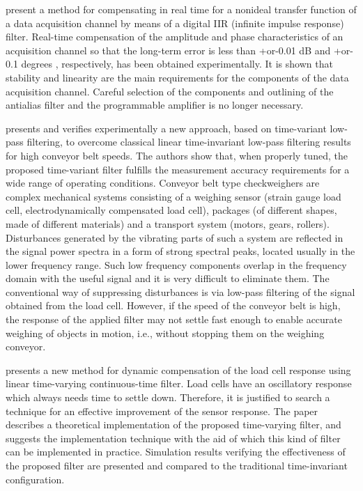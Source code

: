 \documentclass[11pt]{article}
\begin{document}
\citet{Pintelon90} present a method for compensating in real time for a nonideal transfer function of a data acquisition channel by means of a digital IIR (infinite impulse response) filter. Real-time compensation of the amplitude and phase characteristics of an acquisition channel so that the long-term error is less than +or-0.01 dB and +or-0.1 degrees , respectively, has been obtained experimentally. It is shown that stability and linearity are the main requirements for the components of the data acquisition channel. Careful selection of the components and outlining of the antialias filter and the programmable amplifier is no longer necessary.


\citet{Pietrzak14}  presents and verifies experimentally a new approach, based on time-variant low-pass filtering, to overcome classical linear time-invariant low-pass filtering results for high conveyor belt speeds. The authors show that, when properly tuned, the proposed time-variant filter fulfills the measurement accuracy requirements for a wide range of operating conditions.
Conveyor belt type checkweighers are complex mechanical systems consisting of a weighing sensor (strain gauge load cell, electrodynamically compensated load cell), packages (of different shapes, made of different materials) and a transport system (motors, gears, rollers). Disturbances generated by the vibrating parts of such a system are reflected in the signal power spectra in a form of strong spectral peaks, located usually in the lower frequency range. Such low frequency components overlap in the frequency domain with the useful signal and it is very difficult to eliminate them. The conventional way of suppressing disturbances is via low-pass filtering of the signal obtained from the load cell. However, if the speed of the conveyor belt is high, the response of the applied filter may not settle fast enough to enable accurate weighing of objects in motion, i.e., without stopping them on the weighing conveyor.

\citet{Piskorowski08} presents a new method for dynamic compensation of the load cell response using linear time-varying continuous-time filter. Load cells have an oscillatory response which always needs time to settle down. Therefore, it is justified to search a technique for an effective improvement of the sensor response. The paper describes a theoretical implementation of the proposed time-varying filter, and suggests the implementation technique with the aid of which this kind of filter can be implemented in practice. Simulation results verifying the effectiveness of the proposed filter are presented and compared to the traditional time-invariant configuration.
\end{document}
